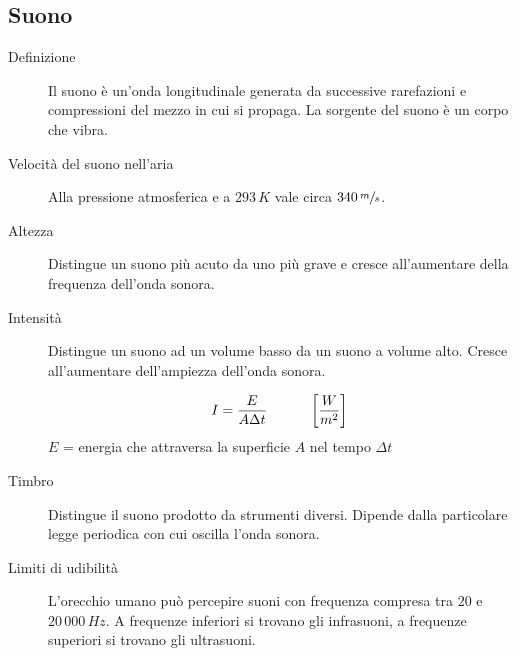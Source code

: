 \documentclass[a4paper,11pt,italian]{article}
\begin{document}
\subsection{Suono}

\begin{description}
  \item[Definizione] 
  Il suono è un'onda longitudinale generata da successive rarefazioni e compressioni del mezzo in cui si propaga.
  La sorgente del suono è un corpo che vibra.

  \item[Velocità del suono nell'aria] 
  Alla pressione atmosferica e a $ 293 \, K $ vale circa $ 340 \, \sfrac{m}{s} $.

  \item[Altezza] 
  Distingue un suono più acuto da uno più grave e cresce all'aumentare della frequenza dell'onda sonora.

  \item[Intensità]
  Distingue un suono ad un volume basso da un suono a volume alto. Cresce all'aumentare dell'ampiezza dell'onda sonora.
\begin{soloscientifico} %
  \[ I = \frac{E}{A \Delta t} \hspace*{3em} \left[ \frac{W}{m^2} \right]\]
  $ E $ = energia che attraversa la superficie $ A $ nel tempo $ \Delta t $
\end{soloscientifico}   %

  \item[Timbro] 
  Distingue il suono prodotto da strumenti diversi. Dipende dalla particolare legge periodica con cui oscilla l'onda sonora.

  \item[Limiti di udibilità] 
  L'orecchio umano può percepire suoni con frequenza compresa tra $ 20 $ e $ 20\, 000 \, Hz $. A frequenze inferiori si trovano gli infrasuoni, a frequenze superiori si trovano gli ultrasuoni.



\end{description}
\end{document}
